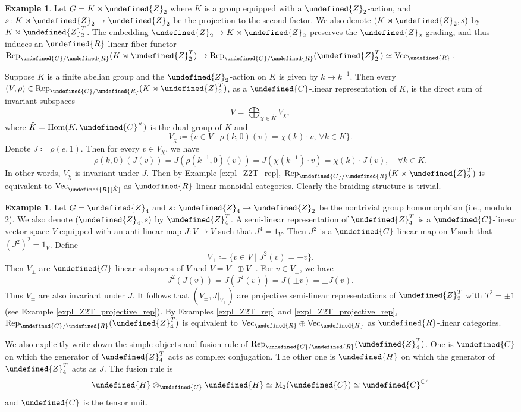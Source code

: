 \documentclass[10pt]{article}
\let\mathbb\undefined
\theoremstyle{definition}
\newtheorem{expl}[thm]{Example}
\numberwithin{equation}{section}
\numberwithin{thm}{section}
\newcommand{\Cb}{\mathbb{C}}
\newcommand{\Hb}{\mathbb{H}}
\newcommand{\Rb}{\mathbb{R}}
\newcommand{\Zb}{\mathbb{Z}}
\DeclareMathOperator{\Hom}{Hom}
\newcommand{\vect}{\mathrm{Vec}}
\newcommand{\rep}{\mathrm{Rep}}
\begin{document}
\begin{expl} \label{expl_semi-linear_rep_semidirect_product}
Let $G = K \rtimes \Zb_2$ where $K$ is a group equipped with a $\Zb_2$-action, and $s \colon K \rtimes \Zb_2 \to \Zb_2$ be the projection to the second factor. We also denote $(K \rtimes \Zb_2,s)$ by $K \rtimes \Zb_2^T$. The embedding $\Zb_2 \to K \rtimes \Zb_2$ preserves the $\Zb_2$-grading, and thus induces an $\Rb$-linear fiber functor $\rep_{\Cb/\Rb}(K \rtimes \Zb_2^T) \to \rep_{\Cb/\Rb}(\Zb_2^T) \simeq \vect_\Rb$.

Suppose $K$ is a finite abelian group and the $\Zb_2$-action on $K$ is given by $k \mapsto k^{-1}$. Then every $(V,\rho) \in \rep_{\Cb/\Rb}(K \rtimes \Zb_2^T)$, as a $\Cb$-linear representation of $K$, is the direct sum of invariant subspaces
\[
V = \bigoplus_{\chi \in \hat K} V_\chi ,
\]
where $\hat K = \Hom(K,\Cb^\times)$ is the dual group of $K$ and
\[
V_\chi \coloneqq \{v \in V \mid \rho(k,0)(v) = \chi(k) \cdot v , \, \forall k \in K \} .
\]
Denote $J \coloneqq \rho(e,1)$. Then for every $v \in V_\chi$, we have
\[
\rho(k,0)(J(v)) = J(\rho(k^{-1},0)(v)) = J(\chi(k^{-1}) \cdot v) = \chi(k) \cdot J(v) , \quad \forall k \in K .
\]
In other words, $V_\chi$ is invariant under $J$. Then by Example \ref{expl_Z2T_rep}, $\rep_{\Cb/\Rb}(K \rtimes \Zb_2^T)$ is equivalent to $\vect_\Rb[\hat K]$ as $\Rb$-linear monoidal categories. Clearly the braiding structure is trivial.
\end{expl}

\begin{expl} \label{expl_Z4T_rep}
Let $G = \Zb_4$ and $s \colon \Zb_4 \to \Zb_2$ be the nontrivial group homomorphism (i.e., modulo $2$). We also denote $(\Zb_4,s)$ by $\Zb_4^T$. A semi-linear representation of $\Zb_4^T$ is a $\Cb$-linear vector space $V$ equipped with an anti-linear map $J \colon V \to V$ such that $J^4 = 1_V$. Then $J^2$ is a $\Cb$-linear map on $V$ such that $(J^2)^2 = 1_V$. Define
\[
V_\pm \coloneqq \{v \in V \mid J^2 (v) = \pm v\} .
\]
Then $V_\pm$ are $\Cb$-linear subspaces of $V$ and $V = V_+ \oplus V_-$. For $v \in V_\pm$, we have
\[
J^2(J(v)) = J(J^2(v)) = J(\pm v) = \pm J(v) .
\]
Thus $V_\pm$ are also invariant under $J$. It follows that $(V_\pm,J\vert_{V_\pm})$ are projective semi-linear representations of $\Zb_2^T$ with $T^2 = \pm 1$ (see Example \ref{expl_Z2T_projective_rep}). By Examples \ref{expl_Z2T_rep} and \ref{expl_Z2T_projective_rep}, $\rep_{\Cb/\Rb}(\Zb_4^T)$ is equivalent to $\vect_\Rb \oplus \vect_\Hb$ as $\Rb$-linear categories.

We also explicitly write down the simple objects and fusion rule of $\rep_{\Cb/\Rb}(\Zb_4^T)$. One is $\Cb$ on which the generator of $\Zb_4^T$ acts as complex conjugation. The other one is $\Hb$ on which the generator of $\Zb_4^T$ acts as $J$. The fusion rule is
\[
\Hb \otimes_\Cb \Hb \simeq \mathrm M_2(\Cb) \simeq \Cb^{\oplus 4}
\]
and $\Cb$ is the tensor unit.
\end{expl}
\end{document}

